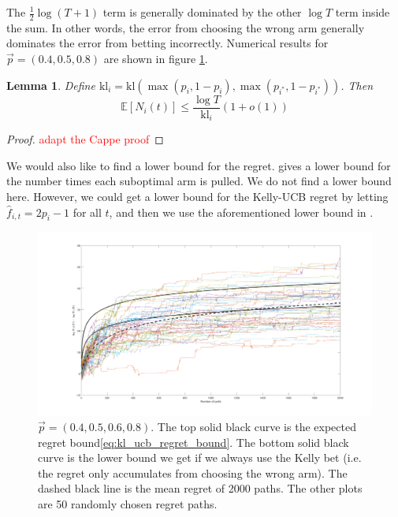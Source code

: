 \documentclass[letterpaper]{article}
\numberwithin{equation}{section}
\theoremstyle{plain}
\newtheorem{lemma}{Lemma}[section]
\begin{document}
The $\frac{1}{2}\log(T+1)$ term is generally dominated by the other $\log T$ term inside the sum. In other words, the error from choosing the wrong arm generally dominates the error from betting incorrectly. Numerical results for $\vec{p} = (0.4, 0.5, 0.8)$ are shown in figure \ref{fig:kelly_ucb_regret}.

\begin{lemma}\label{non_optimal_pulls_bound}
Define $\text{kl}_i = \text{kl}(\max(p_i,1-p_i),\max(p_{i^*}, 1-p_{i^*}))$. Then
\begin{equation*}
\mathbb{E}[N_i(t)] \le \frac{\log T}{\text{kl}_i}(1+o(1))
\end{equation*}
\end{lemma}
\begin{proof}
\textcolor{red}{adapt the Cappe proof}
\end{proof}



We would also like to find a lower bound for the regret. \cite{cappe2013kullback} gives a lower bound for the number times each suboptimal arm is pulled. We do not find a lower bound here. However, we could get a lower bound for the Kelly-UCB regret by letting $\hat{f}_{i,t} = 2p_i-1$ for all $t$, and then we use the aforementioned lower bound in \cite{cappe2013kullback}.

\begin{figure}[ht]
\centering
\includegraphics[width=\textwidth]{kelly_ucb_regret.png}
\caption{$\vec{p} = (0.4, 0.5, 0.6, 0.8)$. The top solid black curve is the expected regret bound\eqref{eq:kl_ucb_regret_bound}. The bottom solid black curve is the lower bound we get if we always use the Kelly bet (i.e. the regret only accumulates from choosing the wrong arm). The dashed black line is the mean regret of 2000 paths. The other plots are 50 randomly chosen regret paths.}
\label{fig:kelly_ucb_regret}
\end{figure}
\pagebreak



\end{document}
